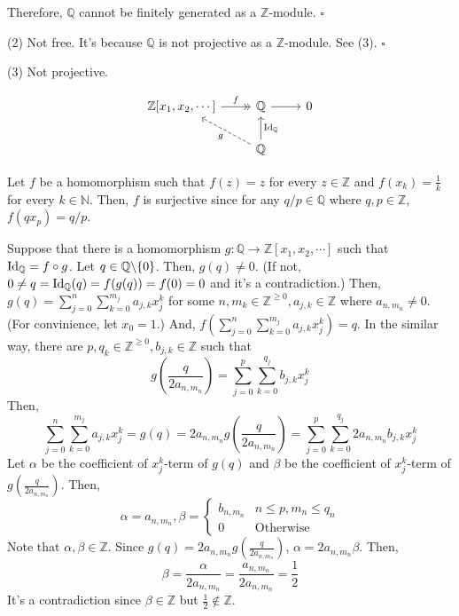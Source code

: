 \documentclass{article}
\newcommand{\bs}{\char`\\}
\newcommand{\qedsq}{\hfill$\square$}
\newcommand{\bbN}{\mathbb{N}}
\newcommand{\bbQ}{\mathbb{Q}}
\newcommand{\bbZ}{\mathbb{Z}}
\newcommand{\Id}{\textnormal{Id}}
\begin{document}
Therefore, \(\bbQ\) cannot be finitely generated as a \(\bbZ\)-module.
\qedsq
\newline

\noindent
(2) Not free. It's because \(\bbQ\) is not projective as a \(\bbZ\)-module. See (3).
\qedsq
\newline

\noindent
(3) Not projective.

\[\begin{tikzcd}
  \bbZ[x_1, x_2, \cdots] \ar[->>, "f"]{r} & \bbQ \ar[->]{r} & 0
  \\
  & \bbQ \ar[->, swap, "\Id_\bbQ"]{u} \ar[->, dashed, "g"]{ul} &
\end{tikzcd}\]

Let \(f\) be a homomorphism such that \(f(z) = z\) for every \(z \in \bbZ\) and \(f(x_k) = \frac{1}{k}\) for every \(k \in \bbN\).
Then, \(f\) is surjective since for any \(q/p \in \bbQ\) where \(q, p \in \bbZ\), \(f(q x_p) = q/p\).

Suppose that there is a homomorphism \(g: \bbQ \to \bbZ[x_1, x_2, \cdots]\)
such that \(\Id_\bbQ = f \circ g\).
Let \(q \in \bbQ \bs \{0\}\).
Then, \(g(q) \neq 0\).
(If not, \(0 \neq q = \Id_\bbQ(q) = f(g(q)) = f(0) = 0\) and it's a contradiction.)
Then, \(g(q) = \sum_{j=0}^n \sum_{k=0}^{m_j} a_{j, k} x_j^k\)
for some \(n, m_k \in \bbZ^{\ge 0}, a_{j, k} \in \bbZ\)
where \(a_{n, m_n} \neq 0\).
(For convinience, let \(x_0 = 1\).)
And, \(f(\sum_{j=0}^n \sum_{k=0}^{m_j} a_{j,k} x_j^k) = q\).
In the similar way, there are \(p, q_k \in \bbZ^{\ge 0}, b_{j, k} \in \bbZ\) such that
\[g(\frac{q}{2a_{n, m_n}}) = \sum_{j=0}^p \sum_{k=0}^{q_j} b_{j, k} x_j^k \]
Then,
\[\sum_{j=0}^n \sum_{k=0}^{m_j} a_{j,k} x_j^k
  = g(q)
  = 2a_{n, m_n} g(\frac{q}{2a_{n, m_n}})
  = \sum_{j=0}^p \sum_{k=0}^{q_j} 2a_{n, m_n} b_{j, k} x_j^k 
\]
Let \(\alpha\) be the coefficient of \(x_j^k\)-term of \(g(q)\) and \(\beta\) be the coefficient of \(x_j^k\)-term of \(g(\frac{q}{2a_{n, m_n}})\).
Then,
\[\alpha = a_{n, m_n},
  \beta = \left\{ \begin{array}{ll} b_{n, m_n} & n \le p, m_n \le q_n \\ 0 & \text{Otherwise} \end{array} \right.\]
Note that \(\alpha, \beta \in \bbZ\).
Since \(g(q) = 2a_{n, m_n} g(\frac{q}{2a_{n, m_n}})\), \(\alpha = 2a_{n, m_n} \beta\).
Then,
\[\beta = \frac{\alpha}{2a_{n, m_n}} = \frac{a_{n, m_n}}{2a_{n, m_n}} = \frac{1}{2}\]
It's a contradiction since \(\beta \in \bbZ\) but \(\frac{1}{2} \not\in \bbZ\).
\end{document}

